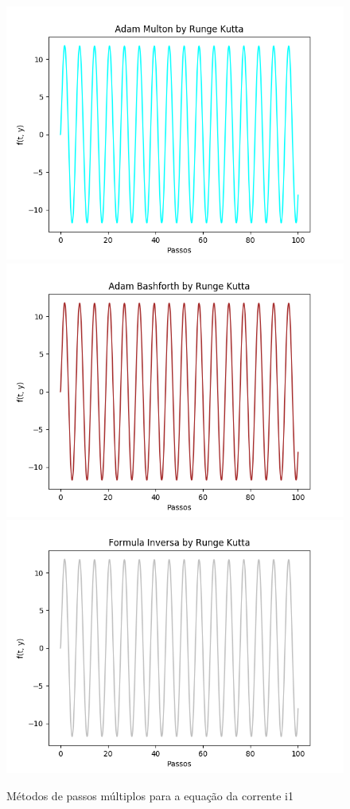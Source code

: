 \documentclass[12pt]{article}%
\begin{document}
    \begin{figure}[H]
        \begin{center}
            \includegraphics[width=.4\textwidth]{problemas/metodos_q3/circuito_multon.png}
            \includegraphics[width=.4\textwidth]{problemas/metodos_q3/circuito_bashforth.png}
            \includegraphics[width=.4\textwidth]{problemas/metodos_q3/circuito_inversa.png}
        \end{center}
        \caption{Métodos de passos múltiplos para a equação da corrente i1}
    \end{figure}
\end{document}
